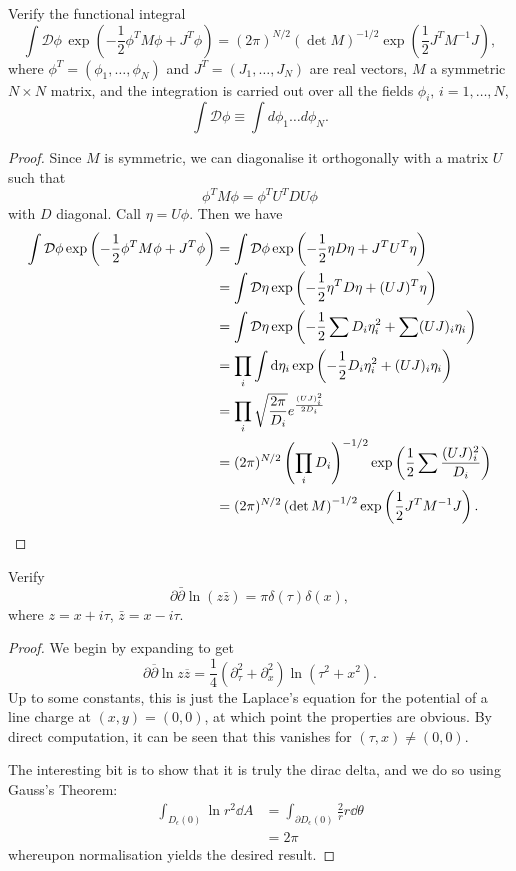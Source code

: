 	\begin{Problem}
	Verify the functional integral
	\[
	\int \mathcal{D}\phi \, \exp\left( -\frac{1}{2} \phi^T M \phi + J^T \phi \right) = (2\pi)^{N/2} (\det M)^{-1/2} \exp\left( \frac{1}{2} J^T M^{-1} J \right),
	\]
	where $\phi^T = (\phi_1, \ldots, \phi_N)$ and $J^T = (J_1, \ldots, J_N)$ are real vectors, $M$ a symmetric $N \times N$ matrix, and the integration is carried out over all the fields $\phi_i,\, i = 1, \ldots, N$,
	\[
	\int \mathcal{D} \phi \equiv \int d\phi_1 \ldots d\phi_N.
	\]
\end{Problem}
	\begin{proof}
		Since $M$ is symmetric, we can diagonalise it orthogonally with a matrix $U$ such that
		\[\phi^T M \phi = \phi^T U^T D U \phi\]
		with $D$ diagonal. Call $\eta = U\phi$. Then we have
		\begin{align*}
			\int \mathcal{D}\phi \exp\left( -\frac{1}{2}\phi^T M \phi + J^T \phi \right) &= \int \mathcal{D}\phi \exp\left( -\frac{1}{2}\eta D\eta + J^T U^T \eta \right)  \\
			&= \int \mathcal{D}\eta \exp\left( -\frac{1}{2}\eta^T D\eta + (UJ)^T \eta \right)  \\
			&= \int \mathcal{D}\eta \exp\left( -\frac{1}{2}\sum D_i \eta_i^2 + \sum(UJ)_i \eta_i \right)  \\
			&= \prod_i \int \dd{\eta_i} \exp\left( -\frac{1}{2}D_i \eta_i^2 + (UJ)_i \eta_i \right)  \\
			&= \prod_i \sqrt{\frac{2\pi}{D_i}}e^{\frac{(UJ)_i^2}{2D_i}}  \\
			&= (2\pi)^{N / 2}\left( \prod_i D_i \right)^{-1 / 2} \exp\left( \frac{1}{2}\sum \frac{(UJ)_i^2}{D_i} \right)   \\
			&= (2\pi)^{N / 2}\left( \det M \right)^{-1 / 2} \exp\left( \frac{1}{2}J^T M^{-1}J \right).\qedhere 
		\end{align*}
	\end{proof}
	\begin{Problem}
	Verify
	\[
	\partial \bar{\partial} \ln(z \bar{z}) = \pi \delta(\tau)\delta(x),
	\]
	where $z = x + i \tau$, $\bar{z} = x - i \tau$.
\end{Problem}
\begin{proof}
	We begin by expanding to get
	\[
	\partial \overline{\partial}\ln z \overline{z}=\frac{1}{4}(\partial_\tau^2+\partial_x^2)\ln(\tau^2+x^2)	
	.\] 
	Up to some constants, this is just the Laplace's equation for the potential of a line charge at $(x,y)=(0,0)$, at which point the properties are obvious. By direct computation, it can be seen that this vanishes for $(\tau,x)\neq (0,0)$. 

	The interesting bit is to show that it is truly the dirac delta, and we do so using Gauss's Theorem:
	\begin{align*}
		\int_{D_\epsilon(0)} \ln r^2 \dd{A} &= \int_{\partial D_\epsilon(0)} \frac{2}{r} r\dd{\theta}\\
		&=  2\pi 
	\end{align*}
	whereupon normalisation yields the desired result.
\end{proof}

